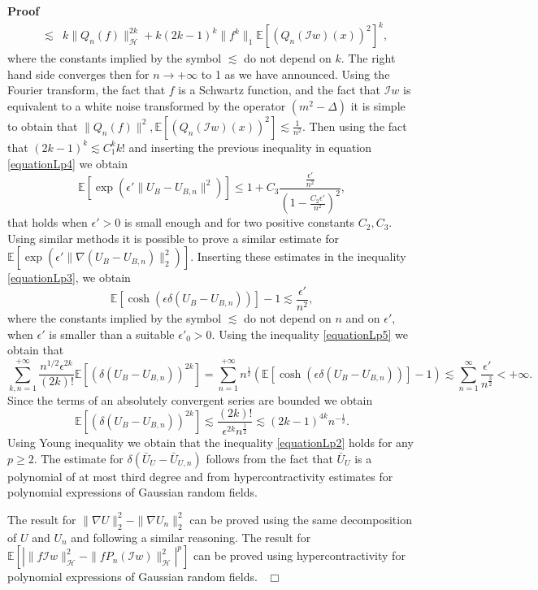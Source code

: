 \documentclass[a4paper,10pt]{article}
\newenvironment{proof}{\noindent\textbf{Proof\ }}{\hspace*{\fill}$\Box$\medskip}
\begin{document}
\begin{proof}
\begin{eqnarray*}
    & \lesssim & k \| Q_n (f) \|^{2 k}_{\mathcal{H}} + k (2 k - 1)^k \| f^k
    \|_1 \mathbb{E} [(Q_n (\mathcal{I}w) (x))^2]^k,
  \end{eqnarray*}
  where the constants implied by the symbol $\lesssim$ do not depend on $k$.
  The right hand side converges then for $n \rightarrow + \infty$ to 1 as we
  have announced. Using the Fourier transform, the fact that $f$ is a Schwartz
  function, and the fact that $\mathcal{I}w$ is equivalent to a white noise
  transformed by the operator $(m^2 - \Delta)$ it is simple to obtain that $\|
  Q_n (f) \|^2, \mathbb{E} [(Q_n (\mathcal{I}w) (x))^2] \lesssim \frac{1}{n^2}
  .$ Then using the fact that $(2 k - 1)^k \lesssim C_1^k k!$ and inserting
  the previous inequality in equation {\eqref{equationLp4}} we obtain
  \[ \mathbb{E} [\exp (\epsilon' \| U_B - U_{B, n} \|^2)] \leqslant 1 + C_3
     \frac{\frac{\epsilon'}{n^2}}{\left( 1 - \frac{C_2 \epsilon'}{n^2}
     \right)^2}, \]
  that holds when $\epsilon' > 0$ is small enough and for two positive
  constants $C_2, C_3$. Using similar methods it is possible to prove a
  similar estimate for $\mathbb{E} [\exp (\epsilon' \| \nabla (U_B - U_{B, n})
  \|^2_2)]$. Inserting these estimates in the inequality
  {\eqref{equationLp3}}, we obtain
  \begin{equation}
    \mathbb{E} [\cosh (\epsilon \delta (U_B - U_{B, n}))] - 1 \lesssim
    \frac{\epsilon'}{n^2}, \label{equationLp5}
  \end{equation}
  where the constants implied by the symbol $\lesssim$ do not depend on $n$
  and on $\epsilon'$, when $\epsilon'$ is smaller than a suitable $\epsilon'_0
  > 0$. Using the inequality {\eqref{equationLp5}} we obtain that
  \[ \sum_{k, n = 1}^{+ \infty} \frac{n^{1 / 2} \epsilon^{2 k}}{(2 k) !}
     \mathbb{E} [(\delta (U_B - U_{B, n}))^{2 k}] = \sum_{n = 1}^{+ \infty}
     n^{\frac{1}{2}} (\mathbb{E} [\cosh (\epsilon \delta (U_B - U_{B, n}))] -
     1) \lesssim \sum_{n = 1}^{\infty} \frac{\epsilon'}{n^{\frac{3}{2}}} < +
     \infty . \]
  Since the terms of an absolutely convergent series are bounded we obtain
  \[ \mathbb{E} [(\delta (U_B - U_{B, n}))^{2 k}] \lesssim \frac{(2 k)
     !}{\epsilon^{2 k} n^{\frac{1}{2}}} \lesssim (2 k - 1)^{4 k} n^{-
     \frac{1}{2}} . \]
  Using Young inequality we obtain that the inequality {\eqref{equationLp2}}
  holds for any $p \geqslant 2$. The estimate for $\delta (\bar{U}_U -
  \bar{U}_{U, n})$ follows from the fact that $\bar{U}_U$ is a polynomial of
  at most third degree and from hypercontractivity estimates for polynomial
  expressions of Gaussian random fields.
  
  The result for $\| \nabla U \|^2_2 - \| \nabla U_n \|^2_2$ can be proved
  using the same decomposition of $U$ and $U_n$ and following a similar
  reasoning. The result for $\mathbb{E} [| \| f\mathcal{I}w\|^2_{\mathcal{H}}
  -\|f P_n (\mathcal{I}w) \|^2_{\mathcal{H}} |^p]$ can be proved using
  hypercontractivity for polynomial expressions of Gaussian random fields. \ 
\end{proof}
\end{document}

